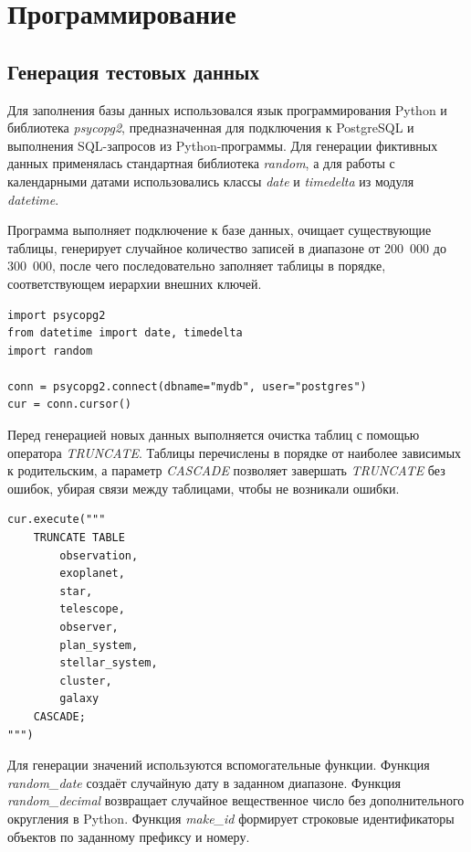 \documentclass[14pt,a4paper]{extarticle}
\begin{document}
	\restoregeometry
\clearpage

\newpage

\section{Программирование}

\subsection{Генерация тестовых данных}

Для заполнения базы данных использовался язык программирования Python и библиотека \textit{psycopg2}, предназначенная для подключения к PostgreSQL и выполнения SQL-запросов из Python-программы. Для генерации фиктивных данных применялась стандартная библиотека \textit{random}, а для работы с календарными датами использовались классы \textit{date} и \textit{timedelta} из модуля \textit{datetime}.

Программа выполняет подключение к базе данных, очищает существующие таблицы, генерирует случайное количество записей в диапазоне от 200~000 до 300~000, после чего последовательно заполняет таблицы в порядке, соответствующем иерархии внешних ключей.

\begin{lstlisting}[caption={Подключение к базе данных}]
import psycopg2
from datetime import date, timedelta
import random

conn = psycopg2.connect(dbname="mydb", user="postgres")
cur = conn.cursor()
\end{lstlisting}

Перед генерацией новых данных выполняется очистка таблиц с помощью оператора \textit{TRUNCATE}. Таблицы перечислены в порядке от наиболее зависимых к родительским, а параметр \textit{CASCADE} позволяет завершать \textit{TRUNCATE} без ошибок, убирая связи между таблицами, чтобы не возникали ошибки.

\begin{lstlisting}[caption={Очистка таблиц перед генерацией}]
cur.execute("""
    TRUNCATE TABLE
        observation,
        exoplanet,
        star,
        telescope,
        observer,
        plan_system,
        stellar_system,
        cluster,
        galaxy
    CASCADE;
""")
\end{lstlisting}

Для генерации значений используются вспомогательные функции. Функция \textit{random\_date} создаёт случайную дату в заданном диапазоне. Функция \textit{random\_decimal} возвращает случайное вещественное число без дополнительного округления в Python. Функция \textit{make\_id} формирует строковые идентификаторы объектов по заданному префиксу и номеру.
\end{document}
